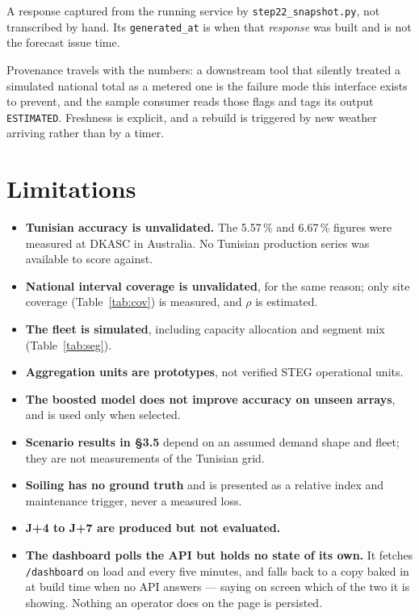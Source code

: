 \documentclass[11pt,a4paper]{article}
\begin{document}

\vspace{-0.4em}
{\footnotesize A response captured from the running service by
\texttt{step22\_snapshot.py}, not transcribed by hand. Its \texttt{generated\_at}
is when that \emph{response} was built and is not the forecast issue time.}

Provenance travels with the numbers: a downstream tool that silently treated a
simulated national total as a metered one is the failure mode this interface
exists to prevent, and the sample consumer reads those flags and tags its output
\texttt{ESTIMATED}. Freshness is explicit, and a rebuild is triggered by new
weather arriving rather than by a timer.

\section{Limitations}

\begin{itemize}
\item \textbf{Tunisian accuracy is unvalidated.} The 5.57\,\% and 6.67\,\%
figures were measured at DKASC in Australia. No Tunisian production series was
available to score against.
\item \textbf{National interval coverage is unvalidated}, for the same reason;
only site coverage (Table~\ref{tab:cov}) is measured, and $\rho$ is estimated.
\item \textbf{The fleet is simulated}, including capacity allocation and segment
mix (Table~\ref{tab:seg}).
\item \textbf{Aggregation units are prototypes}, not verified STEG operational
units.
\item \textbf{The boosted model does not improve accuracy on unseen arrays}, and
is used only when selected.
\item \textbf{Scenario results in \S3.5} depend on an assumed demand shape and
fleet; they are not measurements of the Tunisian grid.
\item \textbf{Soiling has no ground truth} and is presented as a relative index
and maintenance trigger, never a measured loss.
\item \textbf{J+4 to J+7 are produced but not evaluated.}
\item \textbf{The dashboard polls the API but holds no state of its own.} It
fetches \texttt{/dashboard} on load and every five minutes, and falls back to a
copy baked in at build time when no API answers --- saying on screen which of
the two it is showing. Nothing an operator does on the page is persisted.
\end{itemize}
\end{document}
